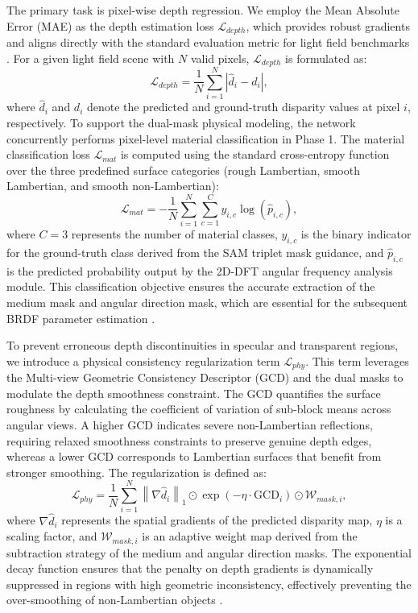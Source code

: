 \documentclass[lettersize,journal]{IEEEtran}
\begin{document}
The primary task is pixel-wise depth regression. We employ the Mean Absolute Error (MAE) as the depth estimation loss $\mathcal{L}_{depth}$, which provides robust gradients and aligns directly with the standard evaluation metric for light field benchmarks \cite{honauer2016}. For a given light field scene with $N$ valid pixels, $\mathcal{L}_{depth}$ is formulated as:
\begin{equation}
\mathcal{L}_{depth} = \frac{1}{N} \sum_{i=1}^{N} \left| \hat{d}_i - d_i \right|,
\end{equation}
where $\hat{d}_i$ and $d_i$ denote the predicted and ground-truth disparity values at pixel $i$, respectively. To support the dual-mask physical modeling, the network concurrently performs pixel-level material classification in Phase 1. The material classification loss $\mathcal{L}_{mat}$ is computed using the standard cross-entropy function over the three predefined surface categories (rough Lambertian, smooth Lambertian, and smooth non-Lambertian):
\begin{equation}
\mathcal{L}_{mat} = - \frac{1}{N} \sum_{i=1}^{N} \sum_{c=1}^{C} y_{i,c} \log(\hat{p}_{i,c}),
\end{equation}
where $C=3$ represents the number of material classes, $y_{i,c}$ is the binary indicator for the ground-truth class derived from the SAM triplet mask guidance, and $\hat{p}_{i,c}$ is the predicted probability output by the 2D-DFT angular frequency analysis module. This classification objective ensures the accurate extraction of the medium mask and angular direction mask, which are essential for the subsequent BRDF parameter estimation \cite{blinn1977}.

To prevent erroneous depth discontinuities in specular and transparent regions, we introduce a physical consistency regularization term $\mathcal{L}_{phy}$. This term leverages the Multi-view Geometric Consistency Descriptor (GCD) and the dual masks to modulate the depth smoothness constraint. The GCD quantifies the surface roughness by calculating the coefficient of variation of sub-block means across angular views. A higher GCD indicates severe non-Lambertian reflections, requiring relaxed smoothness constraints to preserve genuine depth edges, whereas a lower GCD corresponds to Lambertian surfaces that benefit from stronger smoothing. The regularization is defined as:
\begin{equation}
\mathcal{L}_{phy} = \frac{1}{N} \sum_{i=1}^{N} \left\| \nabla \hat{d}_i \right\|_1 \odot \exp\left( - \eta \cdot \text{GCD}_i \right) \odot \mathcal{W}_{mask, i},
\end{equation}
where $\nabla \hat{d}_i$ represents the spatial gradients of the predicted disparity map, $\eta$ is a scaling factor, and $\mathcal{W}_{mask, i}$ is an adaptive weight map derived from the subtraction strategy of the medium and angular direction masks. The exponential decay function ensures that the penalty on depth gradients is dynamically suppressed in regions with high geometric inconsistency, effectively preventing the over-smoothing of non-Lambertian objects \cite{godard2019}.
\end{document}
